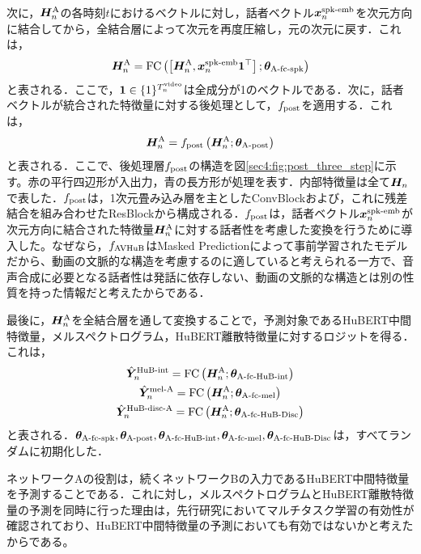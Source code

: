 次に，$\bm{H}^{\text{A}}_{n}$の各時刻$t$におけるベクトルに対し，話者ベクトル$\bm{x}^{\text{spk-emb}}_{n}$を次元方向に結合してから，全結合層によって次元を再度圧縮し，元の次元に戻す．これは，
\begin{equation}
    \bm{H}^{\text{A}}_{n} = \text{FC}\left(\left[\bm{H}^{\text{A}}_{n}, \bm{x}^{\text{spk-emb}}_{n} \bm{1}^{\top}\right]; \bm{\theta}_{\text{A-fc-spk}}\right)
\end{equation}
と表される．ここで，$\bm{1} \in \{1\}^{T^{\text{video}}_{n}}$は全成分が1のベクトルである．次に，話者ベクトルが統合された特徴量に対する後処理として，$f_{\text{post}}$を適用する．これは，
\begin{equation}
    \bm{H}^{\text{A}}_{n} = f_{\text{post}}\left(\bm{H}^{\text{A}}_{n}; \bm{\theta}_{\text{A-post}}\right)
\end{equation}
と表される．ここで、後処理層$f_{\text{post}}$の構造を図\ref{sec4:fig:post_three_step}に示す。赤の平行四辺形が入出力，青の長方形が処理を表す．内部特徴量は全て$\bm{H}_{n}$で表した．$f_{\text{post}}$は，1次元畳み込み層を主としたConvBlockおよび，これに残差結合を組み合わせたResBlockから構成される．$f_{\text{post}}$は，話者ベクトル$\bm{x}^{\text{spk-emb}}_{n}$が次元方向に結合された特徴量$\bm{H}^{\text{A}}_{n}$に対する話者性を考慮した変換を行うために導入した。なぜなら，$f_{\text{AVHuB}}$はMasked Predictionによって事前学習されたモデルだから、動画の文脈的な構造を考慮するのに適していると考えられる一方で、音声合成に必要となる話者性は発話に依存しない、動画の文脈的な構造とは別の性質を持った情報だと考えたからである．

最後に，$\bm{H}^{\text{A}}_{n}$を全結合層を通して変換することで，予測対象であるHuBERT中間特徴量，メルスペクトログラム，HuBERT離散特徴量に対するロジットを得る．これは，
\begin{gather}
    \hat{\bm{Y}}^{\text{HuB-int}}_{n} = \text{FC}\left(\bm{H}^{\text{A}}_{n}; \bm{\theta}_{\text{A-fc-HuB-int}}\right) \\
    \hat{\bm{Y}}^{\text{mel-A}}_{n} = \text{FC}\left(\bm{H}^{\text{A}}_{n}; \bm{\theta}_{\text{A-fc-mel}}\right) \\
    \hat{\bm{Y}}^{\text{HuB-disc-A}}_{n} = \text{FC}\left(\bm{H}^{\text{A}}_{n}; \bm{\theta}_{\text{A-fc-HuB-Disc}}\right)
\end{gather}
と表される．$\bm{\theta}_{\text{A-fc-spk}}, \bm{\theta}_{\text{A-post}}, \bm{\theta}_{\text{A-fc-HuB-int}}, \bm{\theta}_{\text{A-fc-mel}}, \bm{\theta}_{\text{A-fc-HuB-Disc}}$は，すべてランダムに初期化した．

ネットワークAの役割は，続くネットワークBの入力であるHuBERT中間特徴量を予測することである．これに対し，メルスペクトログラムとHuBERT離散特徴量の予測を同時に行った理由は，先行研究においてマルチタスク学習の有効性が確認されており、HuBERT中間特徴量の予測においても有効ではないかと考えたからである。

